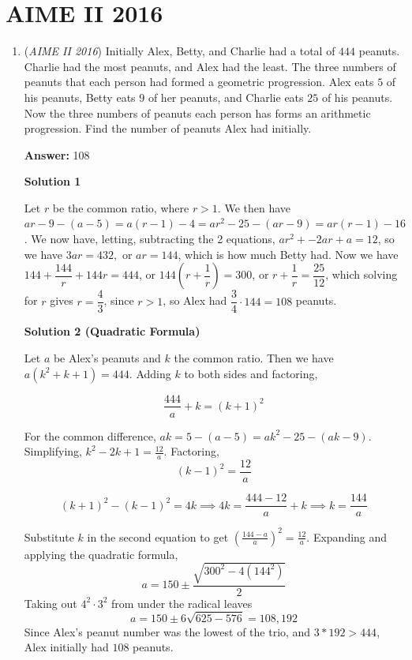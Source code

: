 \section{AIME II 2016}
        \begin{enumerate}
        	\item (\textit{AIME II 2016}) Initially Alex, Betty, and Charlie had a total of $444$ peanuts. Charlie had the most peanuts, and Alex had the least. The three numbers of peanuts that each person had formed a geometric progression. Alex eats $5$ of his peanuts, Betty eats $9$ of her peanuts, and Charlie eats $25$ of his peanuts. Now the three numbers of peanuts each person has forms an arithmetic progression. Find the number of peanuts Alex had initially.


 
 \textbf{Answer: }108



\textbf{Solution 1}

Let $r$ be the common ratio, where $r>1$. We then have $ar-9-(a-5)=a(r-1)-4=ar^{2}-25-(ar-9)=ar(r-1)-16$. We now have, letting, subtracting the 2 equations, $ar^{2}+-2ar+a=12$, so we have $3ar=432,$ or $ar=144$, which is how much Betty had. Now we have $144+\dfrac{144}{r}+144r=444$, or $144(r+\dfrac{1}{r})=300$, or $r+\dfrac{1}{r}=\dfrac{25}{12}$, which solving for $r$ gives $r=\dfrac{4}{3}$, since $r>1$, so Alex had $\dfrac{3}{4} \cdot 144=\boxed{108}$ peanuts.

 



\textbf{Solution 2 (Quadratic Formula)}

Let $a$ be Alex's peanuts and $k$ the common ratio. Then we have $a(k^2+k+1)=444$. Adding $k$ to both sides and factoring,

 
 \[\frac{444}{a}+k=(k+1)^2\]

 For the common difference, $ak=5-(a-5)=ak^2-25-(ak-9)$. Simplifying, $k^2-2k+1=\frac{12}{a}$. Factoring, 
 \[(k-1)^2=\frac{12}{a}\]

 \[(k+1)^2-(k-1)^2=4k \implies 4k=\frac{444-12}{a}+k \implies k=\frac{144}{a}\]

 
Substitute $k$ in the second equation to get $(\frac{144-a}{a})^2=\frac{12}{a}$. Expanding and applying the quadratic formula, 
 \[a=150\pm\frac{\sqrt{300^2-4(144^2)}}{2}\]Taking out $4^2\cdot3^2$ from under the radical leaves 
 \[a=150\pm6\sqrt{625-576}=108, 192\]Since Alex's peanut number was the lowest of the trio, and $3*192>444$, Alex initially had $\boxed{108}$ peanuts.


\end{enumerate}
